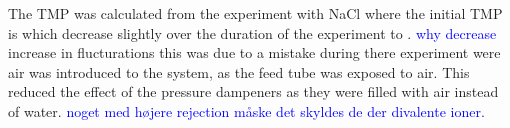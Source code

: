 The TMP was calculated from the experiment with NaCl where the initial TMP is  which decrease slightly over the duration of the experiment to . \textcolor{blue}{why decrease}
increase in flucturations this was due to a mistake during there experiment were air was introduced to the system, as the feed tube was exposed to air. This reduced the effect of the pressure dampeners as they were filled with air instead of water. 
\textcolor{blue}{noget med højere rejection måske det skyldes de der divalente ioner.}






